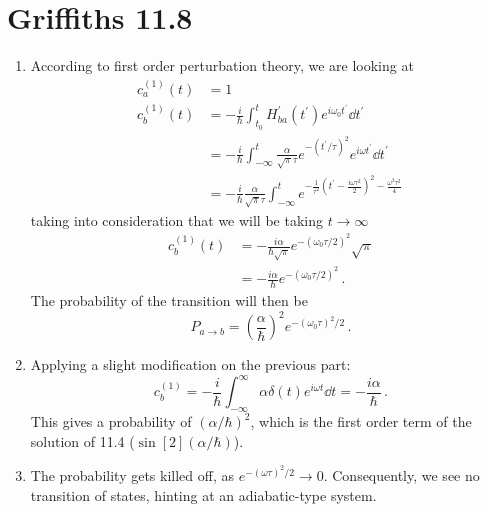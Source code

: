 \documentclass[11pt]{article}
\begin{document}
\section*{Griffiths 11.8}
\begin{enumerate}[label=\alph*)]
\item According to first order perturbation theory, we are looking at
\begin{align*}
c_a^{(1)}(t) & = 1\\
c_b^{(1)}(t) & = -\frac{i}{\hbar} \int_{t_0}^t H^\prime_{ba}(t^\prime)e^{i\omega_0 t^\prime}\dd{t^\prime}\\
& = - \frac{i}{\hbar}\int_{-\infty}^t\frac{\alpha}{\sqrt{\pi}\tau} e^{-(t^\prime/\tau)^2}e^{i\omega t^\prime} \dd{t^\prime}\\
& = -\frac{i}{\hbar}\frac{\alpha}{\sqrt{\pi}\tau}\int_{-\infty}^t e^{-\frac{1}{\tau^2}\left(t^\prime - \frac{i\omega\tau^2}{2}\right)^2 - \frac{\omega^2 \tau^2}{4}}\, 
\end{align*}
taking into consideration that we will be taking $t \rightarrow \infty$
\begin{align*}
c_b^{(1)}(t) & = - \frac{i\alpha}{\hbar \sqrt{\pi}}e^{-(\omega_0 \tau/2)^2}\sqrt{\pi}\\
& = - \frac{i\alpha}{\hbar}e^{-(\omega_0 \tau/2)^2} \, .
\end{align*}
The probability of the transition will then be 
\[\boxed{P_{a\rightarrow b} = \left(\frac{\alpha}{\hbar}\right)^2 e^{-(\omega_0 \tau)^2/2}} \, .\]

\item Applying a slight modification on the previous part:
\[c_b^{(1)} = -\frac{i}{\hbar}\int_{-\infty}^\infty \alpha \delta(t)e^{i\omega t}\dd{t} = -\frac{i\alpha}{\hbar} \, .\]
This gives a probability of $(\alpha/\hbar)^2$, which is the first order term of the solution of 11.4 ($\sin[2](\alpha/\hbar)$).

\item The probability gets killed off, as $e^{-(\omega \tau)^2/2}\rightarrow 0$. Consequently, we see no transition of states, hinting at an adiabatic-type system.

\end{enumerate}

\newpage
\end{document}
